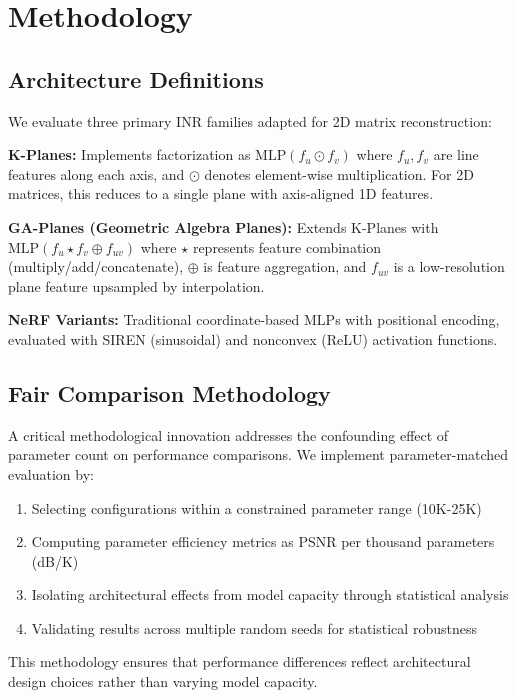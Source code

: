 \documentclass{article}
\begin{document}
\section{Methodology}

\subsection{Architecture Definitions}

We evaluate three primary INR families adapted for 2D matrix reconstruction:

\textbf{K-Planes:} Implements factorization as $\text{MLP}(f_u \odot f_v)$ where $f_u, f_v$ are line features along each axis, and $\odot$ denotes element-wise multiplication. For 2D matrices, this reduces to a single plane with axis-aligned 1D features.

\textbf{GA-Planes (Geometric Algebra Planes):} Extends K-Planes with $\text{MLP}(f_u \star f_v \oplus f_{uv})$ where $\star$ represents feature combination (multiply/add/concatenate), $\oplus$ is feature aggregation, and $f_{uv}$ is a low-resolution plane feature upsampled by interpolation.

\textbf{NeRF Variants:} Traditional coordinate-based MLPs with positional encoding, evaluated with SIREN (sinusoidal) and nonconvex (ReLU) activation functions.

\subsection{Fair Comparison Methodology}

A critical methodological innovation addresses the confounding effect of parameter count on performance comparisons. We implement parameter-matched evaluation by:

\begin{enumerate}
\item Selecting configurations within a constrained parameter range (10K-25K)
\item Computing parameter efficiency metrics as PSNR per thousand parameters (dB/K)
\item Isolating architectural effects from model capacity through statistical analysis
\item Validating results across multiple random seeds for statistical robustness
\end{enumerate}

This methodology ensures that performance differences reflect architectural design choices rather than varying model capacity.
\end{document}
